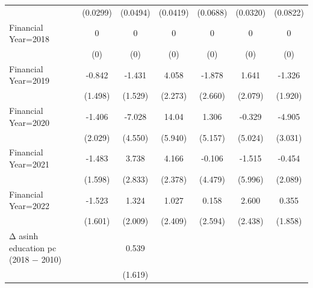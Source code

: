 \begin{table}[htbp]
\begin{tabular}{l*{6}{c}}
                    &    (0.0299)         &    (0.0494)         &    (0.0419)         &    (0.0688)         &    (0.0320)         &    (0.0822)         \\
\addlinespace
Financial Year=2018 &           0         &           0         &           0         &           0         &           0         &           0         \\
                    &         (0)         &         (0)         &         (0)         &         (0)         &         (0)         &         (0)         \\
\addlinespace
Financial Year=2019 &      -0.842         &      -1.431         &       4.058\sym{*}  &      -1.878         &       1.641         &      -1.326         \\
                    &     (1.498)         &     (1.529)         &     (2.273)         &     (2.660)         &     (2.079)         &     (1.920)         \\
\addlinespace
Financial Year=2020 &      -1.406         &      -7.028         &       14.04\sym{**} &       1.306         &      -0.329         &      -4.905         \\
                    &     (2.029)         &     (4.550)         &     (5.940)         &     (5.157)         &     (5.024)         &     (3.031)         \\
\addlinespace
Financial Year=2021 &      -1.483         &       3.738         &       4.166\sym{*}  &      -0.106         &      -1.515         &      -0.454         \\
                    &     (1.598)         &     (2.833)         &     (2.378)         &     (4.479)         &     (5.996)         &     (2.089)         \\
\addlinespace
Financial Year=2022 &      -1.523         &       1.324         &       1.027         &       0.158         &       2.600         &       0.355         \\
                    &     (1.601)         &     (2.009)         &     (2.409)         &     (2.594)         &     (2.438)         &     (1.858)         \\
\addlinespace
Δ asinh education pc (2018 − 2010)&                     &       0.539         &                     &                     &                     &                     \\
                    &                     &     (1.619)         &                     &                     &                     &                     \\

\end{tabular}
\end{table}
